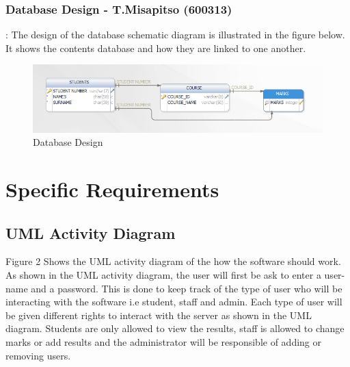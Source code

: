 \documentclass[10pt,onecolumn]{RequimentsGathering}
\begin{document}
\subsubsection{Database Design - T.Misapitso (600313)}:
The design of the database schematic diagram is illustrated in the figure below. It shows the contents database and how they are linked to one another.

\begin{center}
	\begin{figure}[h]
		\centering
		\includegraphics[scale=0.8, width=16cm]{Schematic}
		\caption{Database Design}
	\end{figure}
\end{center}
 

\section{Specific Requirements}

\subsection{UML Activity Diagram}

Figure 2 Shows the UML activity diagram of the how the software should work. As shown in the UML activity diagram, the user will first be ask to enter a user-name and a password. This is done to keep track of the type of user who will be interacting with the software i.e student, staff and admin. Each type of user will be given different rights to interact with the server as shown in the UML diagram. Students are only allowed to view the results, staff is allowed to change marks or add results and the administrator will be responsible of adding or removing users.   
\end{document}
